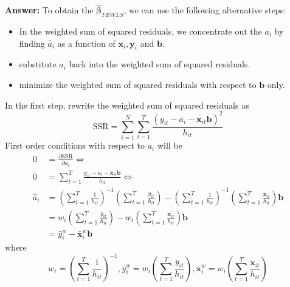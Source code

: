 \begin{enumerate}
\begin{enumerate}
        \textbf{Answer:} To obtain the $\displaystyle\hat{\bm{\beta}}_{FEWLS}$, we can use the following alternative steps: 
        \begin{itemize}
            \item In the weighted sum of squared residuals, we concentrate out the $a_i$ by finding $\hat{a}_i$ as a function of $\mathbf{x}_i, \mathbf{y}_i$ and $\mathbf{b}$.
            \item substitute $\hat{a}_i$ back into the weighted sum of squared residuals.
            \item minimize the weighted sum of squared residuals with respect to $\mathbf{b}$ only.
        \end{itemize}
        In the first step, rewrite the weighted sum of squared residuals as
        \[ \mathrm{SSR} = \sum_{i=1}^{N} \sum_{t=1}^{T}\frac{\left(y_{i t}-a_i-\mathbf{x}_{i t} \mathbf{b}\right)^{2}}{h_{it}} \]
        First order conditions with respect to $a_i$ will be
        \begin{align*}
            0 &= \frac{\partial\mathrm{SSR}}{\partial a_i} \iff \\
            0 &= \sum_{t=1}^T \frac{y_{it}-a_i-\mathbf{x}_{it}\mathbf{b}}{h_{it}} \iff \\
            \hat{a}_i &= \left( \sum_{t=1}^T \frac{1}{h_{it}} \right)^{-1} \left( \sum_{t=1}^T \frac{y_{it}}{h_{it}} \right) - \left( \sum_{t=1}^T \frac{1}{h_{it}} \right)^{-1} \left( \sum_{t=1}^T \frac{\mathbf{x}_{it}}{h_{it}} \right) \mathbf{b} \\
            &= w_i \left( \sum_{t=1}^T \frac{y_{it}}{h_{it}} \right) - w_i \left( \sum_{t=1}^T \frac{\mathbf{x}_{it}}{h_{it}} \right) \mathbf{b} \\
            &= \bar{y}_i^w - \bar{\mathbf{x}}_i^w \mathbf{b}
        \end{align*}
        where
        \[ w_i = \left( \sum_{t=1}^T \frac{1}{h_{it}} \right)^{-1}, \bar{y}_i^w = w_i \left( \sum_{t=1}^T \frac{y_{it}}{h_{it}} \right), \bar{\mathbf{x}}_i^w = w_i \left( \sum_{t=1}^T \frac{\mathbf{x}_{it}}{h_{it}} \right) \]
        

\end{enumerate}
\end{enumerate}
